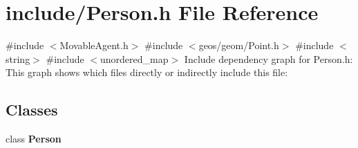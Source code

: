 \section{include/\+Person.h File Reference}
\label{_person_8h}
{\ttfamily \#include $<$Movable\+Agent.\+h$>$}\newline
{\ttfamily \#include $<$geos/geom/\+Point.\+h$>$}\newline
{\ttfamily \#include $<$string$>$}\newline
{\ttfamily \#include $<$unordered\+\_\+map$>$}\newline
Include dependency graph for Person.\+h\+:
This graph shows which files directly or indirectly include this file\+:
\subsection*{Classes}
\begin{DoxyCompactItemize}
\item 
class \textbf{ Person}
\end{DoxyCompactItemize}
